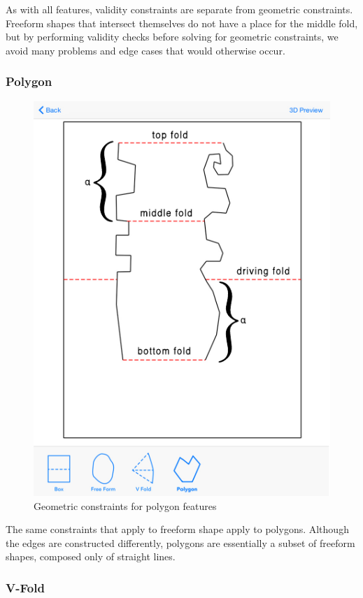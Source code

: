 As with all features, validity constraints are separate from geometric
constraints. Freeform shapes that intersect themselves do not have a
place for the middle fold, but by performing validity checks before
solving for geometric constraints, we avoid many problems and edge cases
that would otherwise occur.

\subsubsection{Polygon}\label{polygon}

\begin{figure}[htbp]
\centering
\includegraphics{figures/45_Tech_Constraints/polygonConstraints.pdf}
\caption{Geometric constraints for polygon features}
\end{figure}

The same constraints that apply to freeform shape apply to polygons.
Although the edges are constructed differently, polygons are essentially
a subset of freeform shapes, composed only of straight lines.

\subsubsection{V-Fold}\label{v-fold}

